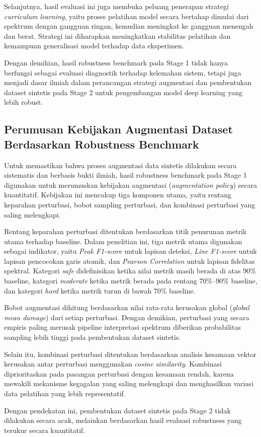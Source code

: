 Selanjutnya, hasil evaluasi ini juga membuka peluang penerapan strategi \textit{curriculum learning}, yaitu proses pelatihan model secara bertahap dimulai dari spektrum dengan gangguan ringan, kemudian meningkat ke gangguan menengah dan berat. Strategi ini diharapkan meningkatkan stabilitas pelatihan dan kemampuan generalisasi model terhadap data eksperimen.

Dengan demikian, hasil robustness benchmark pada Stage 1 tidak hanya berfungsi sebagai evaluasi diagnostik terhadap kelemahan sistem, tetapi juga menjadi dasar ilmiah dalam perancangan strategi augmentasi dan pembentukan dataset sintetis pada Stage 2 untuk pengembangan model deep learning yang lebih robust.



\subsection{Perumusan Kebijakan Augmentasi Dataset Berdasarkan Robustness Benchmark}

Untuk memastikan bahwa proses augmentasi data sintetis dilakukan secara sistematis dan berbasis bukti ilmiah, hasil robustness benchmark pada Stage 1 digunakan untuk merumuskan kebijakan augmentasi (\textit{augmentation policy}) secara kuantitatif. Kebijakan ini mencakup tiga komponen utama, yaitu rentang keparahan perturbasi, bobot sampling perturbasi, dan kombinasi perturbasi yang saling melengkapi.

Rentang keparahan perturbasi ditentukan berdasarkan titik penurunan metrik utama terhadap baseline. Dalam penelitian ini, tiga metrik utama digunakan sebagai indikator, yaitu \textit{Peak F1-score} untuk lapisan deteksi, \textit{Line F1-score} untuk lapisan pencocokan garis atomik, dan \textit{Pearson Correlation} untuk lapisan fidelitas spektral. Kategori \textit{safe} didefinisikan ketika nilai metrik masih berada di atas 90\% baseline, kategori \textit{moderate} ketika metrik berada pada rentang 70\%–90\% baseline, dan kategori \textit{hard} ketika metrik turun di bawah 70\% baseline.

Bobot augmentasi dihitung berdasarkan nilai rata-rata kerusakan global (\textit{global mean damage}) dari setiap perturbasi. Dengan demikian, perturbasi yang secara empiris paling merusak pipeline interpretasi spektrum diberikan probabilitas sampling lebih tinggi pada pembentukan dataset sintetis.

Selain itu, kombinasi perturbasi ditentukan berdasarkan analisis kesamaan vektor kerusakan antar perturbasi menggunakan \textit{cosine similarity}. Kombinasi diprioritaskan pada pasangan perturbasi dengan kesamaan rendah, karena mewakili mekanisme kegagalan yang saling melengkapi dan menghasilkan variasi data pelatihan yang lebih representatif.

Dengan pendekatan ini, pembentukan dataset sintetis pada Stage 2 tidak dilakukan secara acak, melainkan berdasarkan hasil evaluasi robustness yang terukur secara kuantitatif.
